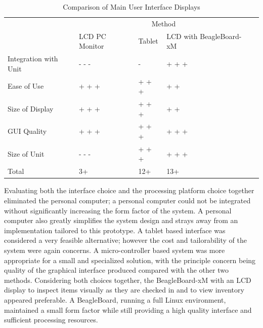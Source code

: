 \documentclass[11pt]{article} %
\begin{document}
\begin{table}[h!]
\vspace{0.5cm}
\caption{Comparison of Main User Interface Displays}
\begin{tabular}{| p{1.6in} | p{1in} | p{1.4in} | p{1.5in} | p{1.5in} |}
\cline{2-4}
\multicolumn{1}{c}{}&\multicolumn{3}{|c|}{Method} \\
\cline{2-4}
\multicolumn{1}{c|}{}&LCD PC \newline Monitor&Tablet&LCD with \newline BeagleBoard-xM\\
\hline
Integration with Unit&- - -&-&+ + +\\
\hline
Ease of Use&+ + +&+ + +&+ +\\
\hline
Size of Display& + + + &+ + +&+ +\\
\hline
GUI Quality&+ + +&+ + +&+ + +\\
\hline
Size of Unit&- - -&+ + +&+ + +\\
\hline
\hline
Total&3+&12+&13+\\
\hline
\end{tabular}
\label{tab:disp}
\end{table}
\quad \newline Evaluating both the interface choice and the processing platform choice together eliminated the personal computer; a personal computer could not be integrated without significantly increasing the form factor of the system. A personal computer also greatly simplifies the system design and strays away from an implementation tailored to this prototype. A tablet based interface was considered a very feasible alternative; however the cost and tailorability of the system were again concerns. A micro-controller based system was more appropriate for a small and specialized solution, with the principle concern being quality of the graphical interface produced compared with the other two methods. Considering both choices together, the BeagleBoard-xM with an LCD display to inspect items visually as they are checked in and to view inventory appeared preferable. A BeagleBoard, running a full Linux environment, maintained a small form factor while still providing a high quality interface and sufficient processing resources.
\end{document}
